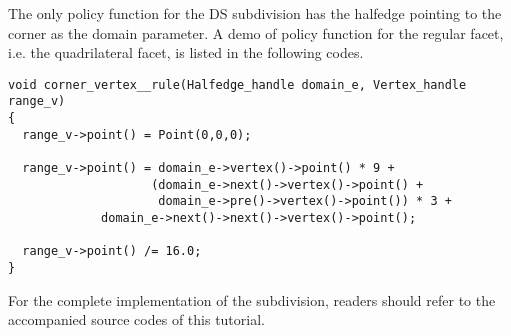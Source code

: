 The only policy function for the DS subdivision has the halfedge
pointing to the corner as the domain parameter. A demo of policy
function for the regular facet, i.e. the quadrilateral facet, is
listed in the following codes.

{\scriptsize
\begin{verbatim}
void corner_vertex__rule(Halfedge_handle domain_e, Vertex_handle range_v) 
{
  range_v->point() = Point(0,0,0);

  range_v->point() = domain_e->vertex()->point() * 9 + 
                    (domain_e->next()->vertex()->point() +
                     domain_e->pre()->vertex()->point()) * 3 +
		     domain_e->next()->next()->vertex()->point();
  
  range_v->point() /= 16.0;
}
\end{verbatim}
}

For the complete implementation of the subdivision, readers should
refer to the accompanied source codes of this tutorial.
